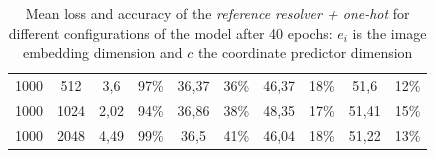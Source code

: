 \begin{table}[b]
\begin{tabular}{cc|cc|cc|cc|cc}
        {1000} & {512}  & {3,6}                                     & {97\%}                              & {36,37}                             & {36\%}                                   & {46,37}       & {18\%}        & {51,6}        & {12\%}        \\
        {1000} & {1024} & {2,02}                                    & {94\%}                              & {36,86}                             & {38\%}                                   & {48,35}       & {17\%}        & {51,41}       & {15\%}        \\
        {1000} & {2048} & {4,49}                                    & {99\%}                              & {36,5}                              & {41\%}                                   & {46,04}       & {18\%}        & {51,22}       & {13\%}        \\
        \bottomrule
    \end{tabular}
    \caption{Mean loss and accuracy of the \emph{reference resolver + one-hot} for different configurations of the model after 40 epochs: $e_i$ is the image embedding dimension and $c$ the coordinate predictor dimension}
    \label{tab:results:reference-resolver-one-hot}
\end{table}

